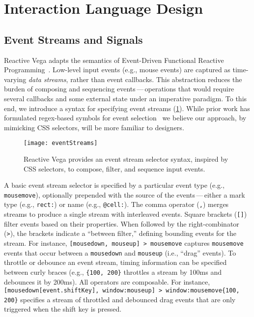 \section{Interaction Language Design}
\label{sec:vg:primitives}

\vspace{-10pt}

\subsection{Event Streams and Signals}

Reactive Vega adapts the semantics of Event-Driven Functional Reactive
Programming~\cite{wan:efrp}. Low-level input events (e.g., mouse events) are
captured as time-varying \emph{data streams}, rather than event callbacks. This
abstraction reduces the burden of composing and sequencing
events\,---\,operations that would require several callbacks and some external
state under an imperative paradigm. To this end, we introduce a syntax for
specifying event streams (\cref{fig:vg:eventStreams}). While prior work has
formulated regex-based symbols for event selection~\cite{kin:proton++} we
believe our approach, by mimicking CSS selectors, will be more familiar to
designers.

\begin{figure}[t!]
  \centering
  \texttt{[image: eventStreams]}
  \caption{Reactive Vega provides an event stream selector syntax, inspired by
  CSS selectors, to compose, filter, and sequence input events.}
  \label{fig:vg:eventStreams}
\end{figure}

A basic event stream selector is specified by a particular event type (e.g.,
\texttt{mousemove}), optionally prepended with the source of the
events\,---\,either a mark type (e.g., \texttt{rect:}) or name (e.g.,
\texttt{@cell:}). The comma operator (\texttt{,}) merges streams to produce a
single stream with interleaved events. Square brackets (\texttt{[]}) filter
events based on their properties. When followed by the right-combinator
(\texttt{>}), the brackets indicate a ``between filter,'' defining bounding
events for the stream. For instance, \texttt{[mousedown, mouseup] > mousemove}
captures \texttt{mousemove} events that occur between a \texttt{mousedown} and
\texttt{mouseup} (i.e., ``drag'' events). To throttle or debounce an event
stream, timing information can be specified between curly braces (e.g.,
\texttt{\{100, 200\}} throttles a stream by 100ms and debounces it by 200ms).
All operators are composable. For instance, \texttt{[mousedown[event.shiftKey],
window:mouseup] > window:mousemove\{100, 200\}} specifies a stream of throttled
and debounced drag events that are only triggered when the shift key is pressed.

